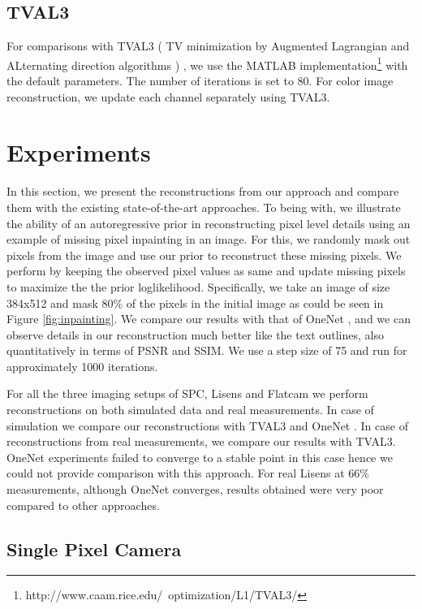 \documentclass[journal,twoside]{IEEEtran}
\begin{document}
\subsection{TVAL3}
For comparisons with TVAL3 ( TV minimization by Augmented Lagrangian and ALternating direction algorithms ) \cite{li2013efficient}, we use the MATLAB implementation\footnote{http://www.caam.rice.edu/~optimization/L1/TVAL3/} with the default parameters. The number of iterations is set to 80. For color image reconstruction, we update each channel separately using TVAL3.

\section{Experiments}
In this section, we present the reconstructions from our approach and compare them with the existing state-of-the-art approaches. To being with, we illustrate the ability of an autoregressive prior in reconstructing pixel level details using an example of missing pixel inpainting in an image. For this, we randomly mask out pixels from the image and use our prior to reconstruct these missing pixels. We perform by keeping the observed pixel values as same and update missing pixels to maximize the the prior loglikelihood. Specifically, we take an image of size 384x512 and mask 80\% of the pixels in the initial image as could be seen in Figure \ref{fig:inpainting}. We compare our results with that of OneNet \cite{chang2017one}, and we can observe details in our reconstruction much better like the text outlines, also quantitatively in terms of PSNR and SSIM. We use a step size of 75 and run for approximately 1000 iterations. 

For all the three imaging setups of SPC, Lisens and Flatcam we perform reconstructions on both simulated data and real measurements. In case of simulation we compare our reconstructions with TVAL3 \cite{li2013efficient} and OneNet \cite{chang2017one}. In case of reconstructions from real measurements, we compare our results with TVAL3. OneNet experiments failed to converge to a stable point in this case hence we could not provide comparison with this approach. For real Lisens at 66\% measurements, although OneNet converges, results obtained were very poor compared to other approaches.


\subsection{Single Pixel Camera}
\end{document}

